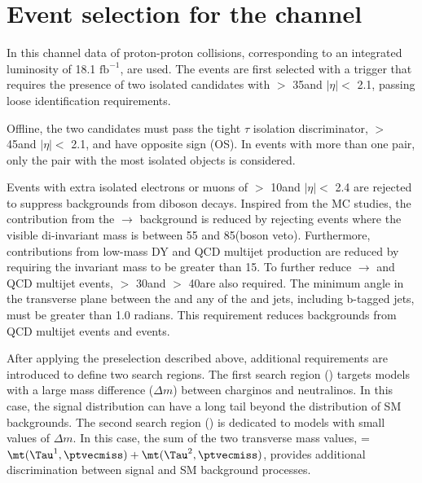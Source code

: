 \section{\texorpdfstring{Event selection for the \tauTau channel}{Event selection for the tau-tau channel}}
\label{sect:tauTauCuts}
In this channel data of proton-proton collisions,  corresponding to an integrated luminosity of 18.1 $\mathrm{fb}^{-1}$, are used.
The events are first selected with a trigger \cite{Chatrchyan:2011nv} that requires the presence of two isolated 
\Tau candidates with \PT $>$ 35\GeV and $|\eta|<$ 2.1, passing loose identification requirements.

Offline, the two \Tau candidates must pass the tight $\tau$ isolation discriminator,
\PT $>$ 45\GeV and $|\eta|<$ 2.1, and have opposite sign (OS).
In events with more than one \tauTau pair, only the pair with the most isolated \Tau objects is considered. 

Events with extra isolated electrons or muons of \PT $>$ 10\GeV and $|\eta| <$ 2.4 
are rejected to suppress backgrounds from diboson decays. 
Inspired from the MC studies, 
the contribution from the \Z$ \rightarrow$ \tauTau  background is reduced by rejecting events 
where the visible di-\Tau invariant mass is between 55 and 85\GeV (\Z boson veto).  
Furthermore, contributions from low-mass DY and QCD multijet production are 
reduced by requiring the invariant mass to be greater than 15\GeV.
To further reduce \Z $\rightarrow$ \tauTau and QCD multijet events, 
\MPT $>$ 30\GeV and \mttwo $>$ 40\GeV are also required.
The minimum angle \deltaphi in the transverse plane between the \ptvecmiss and any of the \Tau and jets, 
including b-tagged jets, must be greater than 1.0 radians. 
This requirement reduces backgrounds from QCD multijet events and \wjets events.

After applying the preselection described above,
additional requirements are introduced to define two search regions.
The first search region (\binone) targets models with a large mass difference ($\Delta m$) 
between charginos and neutralinos.
In this case, the \mttwo signal distribution can have a long tail beyond the 
distribution of SM backgrounds.
The second search region (\bintwo) is dedicated to models with small values of $\Delta m$.
In this case, the sum of the two transverse mass values, \SumMT = $\mt(\Tau^1,\ptvecmiss) + \mt(\Tau^2,\ptvecmiss)$, 
provides additional discrimination between signal and SM background processes.

